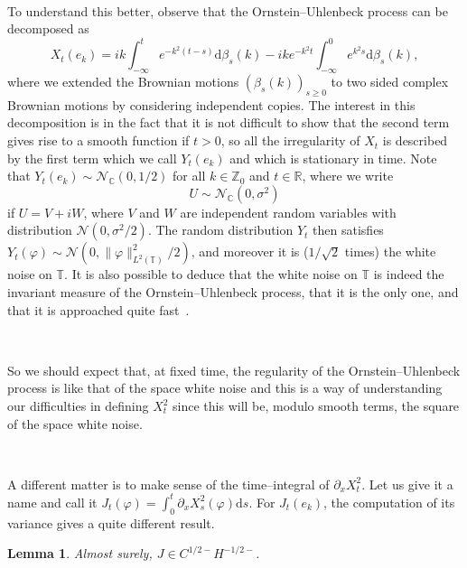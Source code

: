 \documentclass[a4paper,11pt]{article}
\newcommand{\mathd}{\mathrm{d}}
\newtheorem{lemma}{Lemma}
{\theorembodyfont{\rmfamily}\newtheorem{remark}{Remark}}
\begin{document}
\

To understand this better, observe that the Ornstein--Uhlenbeck process can
be decomposed as
\[ X_t (e_k) = ik \int_{- \infty}^t e^{- k^2 (t - s)} \mathd \beta_s (k) - ik
   e^{- k^2 t} \int_{- \infty}^0 e^{k^2 s} \mathd \beta_s (k), \]
where we extended the Brownian motions $(\beta_s (k))_{s \geqslant 0}$ to two
sided complex Brownian motions by considering independent copies. The interest in this decomposition is in the fact
that it is not
difficult to show that the second term gives rise to a smooth function if $t >
0$, so all the irregularity of $X_t$ is described by the first term which we
call $Y_t (e_k)$ and which is stationary in time. Note that $Y_t (e_k) \sim \mathcal{N}_{\mathbb{C}} (0, 1 /
2)$ for all $k \in \mathbb{Z}_0$ and $t \in \mathbb{R}$, where we write
\[ U \sim \mathcal{N}_{\mathbb{C}} (0, \sigma^2) \]
if $U = V + i W$, where $V$ and $W$ are independent random variables with
distribution $\mathcal{N} (0, \sigma^2 / 2)$. The random distribution $Y_t$
then satisfies $Y_t (\varphi) \sim \mathcal{N} (0, \| \varphi \|_{L^2
(\mathbb{T})}^2 / 2)$, and moreover it is ($1 / \sqrt{2}$ times) the
white noise on $\mathbb{T}$. It is also possible to deduce that the white
noise on $\mathbb{T}$ is indeed the invariant measure of the
Ornstein--Uhlenbeck process, that it is the only one, and that it is
approached quite fast~\cite{karazas}.

\

So we should expect that, at fixed time, the regularity of the
Ornstein--Uhlenbeck process is like that of the space white noise and this is
a way of understanding our difficulties in defining $X^2_t$ since this will
be, modulo smooth terms, the square of the space white noise.

\

A different matter is to make sense of the time--integral of $\partial_x
X^2_t$. Let us give it a name and call it $J_t (\varphi) = \int_0^t \partial_x
X_s^2 (\varphi) \mathd s$. For $J_t (e_k)$, the computation of its variance
gives a quite different result.

\begin{lemma}
  \label{lem:OU square}Almost surely, $J \in C^{1 / 2 -} H^{- 1 / 2 -}$.
\end{lemma}
\end{document}
